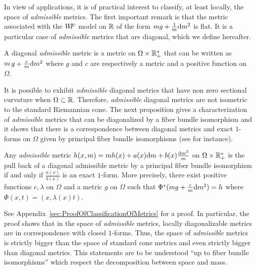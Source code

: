 In view of applications, it is of practical interest to classify, at least locally, the space of \textit{admissible} metrics. The first important remark is that the metric associated with the $W\! \! F$ model on $\mathbb{R}$ of the form $mg +  \frac{1}{ m} \mathrm{d} m^2$ is flat. It is a particular case of \textit{admissible} metrics that are diagonal, which we define hereafter.
\begin{definition}
A diagonal \textit{admissible}  metric is a metric on $\Omega \times \mathbb{R}_+^*$ that can be written as $m\,g +  \frac{c}{m} \mathrm{d} m^2$ where $g$ and $c$ are respectively a metric and a positive function on $\Omega$. 
\end{definition}
It is possible to exhibit \textit{admissible} diagonal metrics that have non zero sectional curvature when $\Omega \subset \mathbb{R}$. Therefore, \textit{admissible} diagonal metrics are not isometric to the standard Riemannian cone.
The next proposition gives a characterization of  \textit{admissible}  metrics that can be diagonalized by a fiber bundle isomorphism \cite[Section 17]{Michor2008b} and it shows that there is a correspondence between diagonal metrics and exact $1$-forms on $\Omega$ given by principal fiber bundle isomorphisms (see \cite[Section 18.6]{Michor2008b} for instance).

\begin{proposition}\label{th:ClassificationOfMetrics}
Any \textit{admissible} metric $h(x,m) = m h(x) + a(x)  \mathrm{d} m + b(x) \frac{\mathrm{d} m^2}{m}$ on $\Omega \times \mathbb{R}_+^*$ is the pull back of a diagonal admissible metric by a principal fiber bundle isomorphism if and only if $\frac{a(x)}{b(x)}$ is an exact  $1$-form. More precisely, there exist positive functions $c, \lambda$ on $\Omega$ and a metric $g$ on $\Omega$ such that $\Phi^*(mg +  \frac{c}{ m} \mathrm{d} m^2) = h$ where $\Phi(x,t)= (x,\lambda(x)t)$.
\end{proposition}

See Appendix~\ref{sec:ProofOfClassificationOfMetrics} for a proof. In particular, the proof shows that in the space of \textit{admissible} metrics, locally diagonalizable metrics are in correspondence with closed $1$-forms. Thus, the space of \textit{admissible} metrics is strictly bigger than the space of standard cone metrics and even strictly bigger than diagonal metrics. This statements are to be understood ``up to fiber bundle isomorphisms'' which respect the decomposition between space and mass. %


